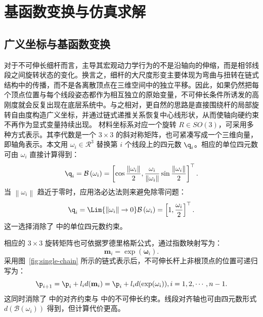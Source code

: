 \section{基函数变换与仿真求解}

\subsection{广义坐标与基函数变换}
对于不可伸长细杆而言，主导其宏观动力学行为的不是沿轴向的伸缩，而是相邻线段之间旋转状态的变化。换言之，细杆的大尺度形变主要体现为弯曲与扭转在链式结构中的传播，而不是各离散顶点在三维空间中的独立平移。因此，如果仍然把每个顶点位置与每个线段姿态都作为相互独立的原始变量，不可伸长条件所诱发的高刚度就会反复出现在底层系统中。与之相对，更自然的思路是直接围绕杆的局部旋转自由度构造广义坐标，并通过链式递推关系恢复中心线形状，从而使轴向硬约束不再作为显式变量持续出现。
材料坐标系对应一个旋转 $R\in SO(3)$，可采用多种方式表示。其李代数是一个 $3 \times 3$ 的斜对称矩阵，也可紧凑写成一个三维向量，即轴角表示。本文用 $\omega_i\in\mathcal{R}^3$ 替换第 $i$ 个线段上的四元数 $\q_i$。相应的单位四元数可由 $\omega_i$ 直接计算得到：
\begin{equation}
  \q_i = \mathcal{B}\left(\omega_i\right) = \left[\cos \frac{\left\|
      \omega_i \right\|}{2}, \frac{\omega_i}{\left\| \omega_i \right\| }
    \sin \frac{\left\| \omega_i \right\|}{2}\right]^\top.
    \label{eq: omega2quaternion}
\end{equation}
当 $\left\| \omega_i \right\|$ 趋近于零时，应用洛必达法则来避免除零问题：
\begin{equation}
  \q_i = \Lim{\left\| \omega_i \right\| \rightarrow
    0} \mathcal{B}\left(\omega_i\right)
    = \left[1, \frac{\omega_i}{2} \right]^\top.
    \label{eq: omega2quaternion2}
\end{equation}
这一选择消除了  中的单位四元数约束。

{\color{black}相应的 $3\times 3$ 旋转矩阵也可依据罗德里格斯公式，通过指数映射写为：}
\begin{equation}
\mathbf{m}_i
= \operatorname{exp}\left( \mathbf{\omega}_i\right).
\end{equation}
采用图~\ref{fig:single-chain} 所示的链式表示后，不可伸长杆上非根顶点的位置可递归写为：
\begin{equation}
\p_{i+1}=\p_i+l_id(\mathbf{m}_i)=\p_i+l_id(\operatorname{exp}(\omega_i)), i=1,2,\cdots,n-1.
\label{eq:w2p}
\end{equation}
这同时消除了  中的对齐约束与  中的不可伸长约束。线段对齐轴也可由四元数形式 $d(\mathcal{B}(\omega_i))$ 得到，但计算代价更高。

